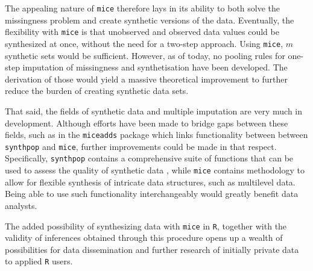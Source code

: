 \documentclass[psych,article,submit,moreauthors,pdftex]{mdpi}
\begin{document}
The appealing nature of \texttt{mice} therefore lays in its ability to
both solve the missingness problem and create synthetic versions of the
data. Eventually, the flexibility with \texttt{mice} is that unobserved
and observed data values could be synthesized at once, without the need
for a two-step approach. Using \texttt{mice}, \(m\) synthetic sets would
be sufficient. However, as of today, no pooling rules for one-step
imputation of missingness and synthetisation have been developed. The
derivation of those would yield a massive theoretical improvement to
further reduce the burden of creating synthetic data sets.

That said, the fields of synthetic data and multiple imputation are very
much in development. Although efforts have been made to bridge gaps
between these fields, such as in the \texttt{miceadds} package
\citep{miceadds_3.11-6} which links functionality between between
\texttt{synthpop} and \texttt{mice}, further improvements could be made
in that respect. Specifically, \texttt{synthpop} contains a
comprehensive suite of functions that can be used to assess the quality
of synthetic data \citep[e.g., see][]{snoke2018general}, while
\texttt{mice} contains methodology to allow for flexible synthesis of
intricate data structures, such as multilevel data. Being able to use
such functionality interchangeably would greatly benefit data analysts.

The added possibility of synthesizing data with \texttt{mice} in
\texttt{R}, together with the validity of inferences obtained through
this procedure opens up a wealth of possibilities for data dissemination
and further research of initially private data to applied \texttt{R}
users.

%

\vspace{6pt}

\end{document}
